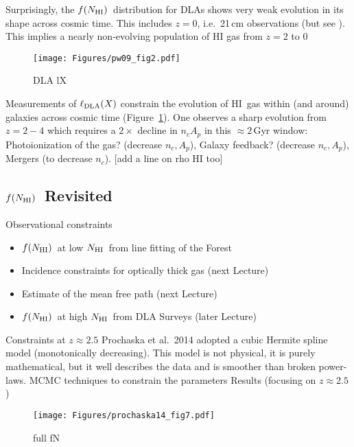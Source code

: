 \documentclass[graybox]{svmult}
\newcommand{\HI}{H{\sc I}}
\newcommand{\mnhi}{N_{\rm HI}}
\newcommand{\nhi}{$\mnhi$}
\def\mfnhi{f(\mnhi)}
\def\fnhi{$\mfnhi$}
\begin{document}
Surprisingly, the \fnhi\ distribution for DLAs shows
very weak evolution in its shape across cosmic time.
This includes $z=0$, i.e.\ 21\,cm observations 
\cite{zvb+05} (but see \cite{braun12}).
This implies a nearly non-evolving population of HI gas from $z=2$ to 0

%
\begin{figure}[b]
\sidecaption
\texttt{[image: Figures/pw09\_fig2.pdf]}
%
%
\caption{DLA lX
}
\label{fig:pw09}       %
\end{figure}
  
Measurements of $\ell_{\rm DLA} (X)$ constrain the evolution of 
\HI\ gas within (and around) galaxies across cosmic time
(Figure~\ref{fig:pw09}).
One observes a  sharp evolution from $z=2-4$ which
requires a $2\times$ decline in $n_c A_p$ in this
$\approx 2$\,Gyr window:
Photoionization of the gas? (decrease $n_c, A_p$),
Galaxy feedback? (decrease $n_c, A_p$),
Mergers (to decrease $n_c$).
[add a line on rho HI too]

\subsection{\fnhi\ Revisited}


Observational constraints
		\begin{itemize}
		\item \fnhi\ at low \nhi\ from line fitting of the Forest
		\item Incidence constraints for optically thick gas (next Lecture)
		\item Estimate of the mean free path (next Lecture)
		\item \fnhi\ at high \nhi\ from DLA Surveys (later Lecture)
		\end{itemize}
Constraints at $z \approx 2.5$
Prochaska et al.\ 2014
adopted a cubic Hermite spline model (monotonically decreasing).
This model is not physical, it is purely mathematical, 
but it well describes the data and is
smoother than broken power-laws.
MCMC techniques to constrain the parameters
Results (focusing on $z \approx 2.5$)

%
\begin{figure}[b]
\sidecaption
\texttt{[image: Figures/prochaska14\_fig7.pdf]}
%
%
\caption{full fN
}
\label{fig:full_fN}       %
\end{figure}
\end{document}
